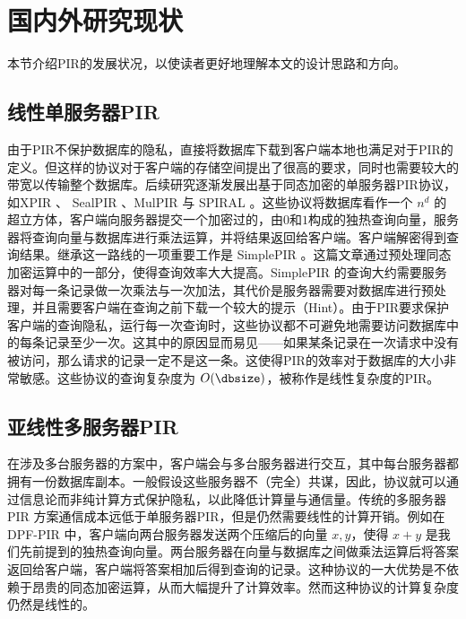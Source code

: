 \section{国内外研究现状}

本节介绍PIR的发展状况，以使读者更好地理解本文的设计思路和方向。

\subsection{线性单服务器PIR}
由于PIR不保护数据库的隐私，直接将数据库下载到客户端本地也满足对于PIR的定义。但这样的协议对于客户端的存储空间提出了很高的要求，同时也需要较大的带宽以传输整个数据库。后续研究逐渐发展出基于同态加密的单服务器PIR协议，如XPIR \cite{EPRINT:ABFK14}、 SealPIR \cite{SP:ACLS18}、MulPIR \cite{USENIX:ALPRSSY21} 与 SPIRAL \cite{SP:MenWu22}。这些协议将数据库看作一个 $n^d$ 的超立方体，客户端向服务器提交一个加密过的，由$0$和$1$构成的独热查询向量，服务器将查询向量与数据库进行乘法运算，并将结果返回给客户端。客户端解密得到查询结果。继承这一路线的一项重要工作是 SimplePIR \cite{SimplePIR}。这篇文章通过预处理同态加密运算中的一部分，使得查询效率大大提高。SimplePIR 的查询大约需要服务器对每一条记录做一次乘法与一次加法，其代价是服务器需要对数据库进行预处理，并且需要客户端在查询之前下载一个较大的提示（Hint）。由于PIR要求保护客户端的查询隐私，运行每一次查询时，这些协议都不可避免地需要访问数据库中的每条记录至少一次。这其中的原因显而易见——如果某条记录在一次请求中没有被访问，那么请求的记录一定不是这一条。这使得PIR的效率对于数据库的大小非常敏感。这些协议的查询复杂度为 $O(\dbsize)$，被称作是线性复杂度的PIR。

\subsection{亚线性多服务器PIR}

在涉及多台服务器的方案中，客户端会与多台服务器进行交互，其中每台服务器都拥有一份数据库副本。一般假设这些服务器不（完全）共谋，因此，协议就可以通过信息论而非纯计算方式保护隐私，以此降低计算量与通信量。传统的多服务器 PIR 方案通信成本远低于单服务器PIR，但是仍然需要线性的计算开销。例如在 DPF-PIR \cite{DPF-PIR}中，客户端向两台服务器发送两个压缩后的向量 $x,y$，使得 $x + y$ 是我们先前提到的独热查询向量。两台服务器在向量与数据库之间做乘法运算后将答案返回给客户端，客户端将答案相加后得到查询的记录。这种协议的一大优势是不依赖于昂贵的同态加密运算，从而大幅提升了计算效率。然而这种协议的计算复杂度仍然是线性的。

